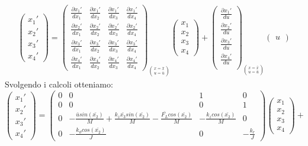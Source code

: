 \begin{displaymath}
\begin{array}{l}
\left(\begin{array}{c}
x_{1}'\\
x_{2}'\\
x_{3}'\\
x_{4}'
\end{array}\right)=\left(\begin{array}{cccc}
\frac{\partial x_{1}'}{dx_{1}} & \frac{\partial x_{1}'}{dx_{2}} & \frac{\partial x_{1}'}{dx_{3}} & \frac{\partial x_{1}'}{dx_{4}}\\
\frac{\partial x_{2}'}{dx_{1}} & \frac{\partial x_{2}'}{dx_{2}} & \frac{\partial x_{2}'}{dx_{3}} & \frac{\partial x_{2}'}{dx_{4}}\\
\frac{\partial x_{3}'}{dx_{1}} & \frac{\partial x_{3}'}{dx_{2}} & \frac{\partial x_{3}'}{dx_{3}} & \frac{\partial x_{3}'}{dx_{4}}\\
\frac{\partial x_{4}'}{dx_{1}} & \frac{\partial x_{4}'}{dx_{2}} & \frac{\partial x_{4}'}{dx_{3}} & \frac{\partial x_{4}'}{dx_{4}}
\end{array}\right)_{\binom{x=\bar{x}}{u=\bar{u}}}\left(\begin{array}{c}
x_{1}\\
x_{2}\\
x_{3}\\
x_{4}
\end{array}\right)+\left(\begin{array}{cc}
\frac{\partial x_{1}'}{du} \\
\frac{\partial x_{2}'}{du} \\
\frac{\partial x_{3}'}{du} \\
\frac{\partial x_{4}'}{du} \\
\end{array}\right)_{\binom{x=\bar{x}}{u=\bar{u}}}\left(\begin{array}{c}
u
\end{array}\right)

\end{array}
\end{displaymath}
Svolgendo i calcoli otteniamo:
\begin{displaymath}
\left(\begin{array}{c}
x_{1}'\\
x_{2}'\\
x_{3}'\\
x_{4}'
\end{array}\right)=\left(\begin{array}{cccc}
0 & 0 & 1 & 0\\
0 & 0 & 0 & 1\\
0 & -\frac{\bar usin(\bar{x_{2}})}{M}+\frac{k_{z}\bar{x_{3}}sin(\bar{x_{2}})}{M}-\frac{\bar{F_L}cos(\bar{x_{2}})}{M} & -\frac{k_{z}cos(\bar{x_{2}})}{M} & 0\\
0 & -\frac{k_{\vartheta}cos(\bar{x_{2}})}{J} & 0 & -\frac{k_{r}}{J}
\end{array}\right)\left(\begin{array}{c}
x_{1}\\
x_{2}\\
x_{3}\\
x_{4}
\end{array}\right)+ 
\end{displaymath}
